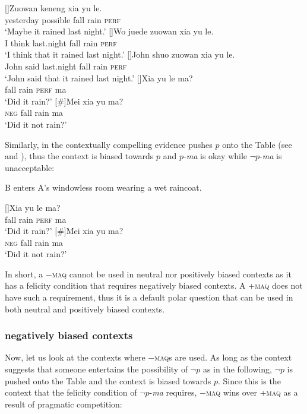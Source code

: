 \documentclass[output=paper,colorlinks,citecolor=brown]{langscibook}
\begin{document}
\ea\label{weakb}
\begin{xlist}
[]{\gll Zuowan keneng  xia yu le. \\
yesterday possible fall rain \textsc{perf}\\
\glt `Maybe it  rained last night.'\label{keneng}}
[]{\gll Wo  juede zuowan xia yu le.\\
I think last.night fall rain \textsc{perf}\\
\glt `I  think that it rained last night.'}
[]{\gll John shuo zuowan  xia yu le. \\
John said last.night  fall rain \textsc{perf}\\
\glt `John said that it rained last night.'\label{john}}
[]{\gll Xia yu le ma?\\
fall rain \textsc{perf} ma \\
\glt `Did it rain?'}
[\#]{\gll Mei xia yu  ma? \\
\textsc{neg} fall rain ma\\
\glt `Did it not rain?' }
\end{xlist}
\z

Similarly, in  the contextually compelling evidence pushes $p$ onto the Table (see  and ), thus the context is biased towards $p$ and  $p$-\emph{ma} is okay while $\neg p$-\emph{ma} is unacceptable:

\ea\label{rc} B enters A's windowless  room wearing a wet raincoat.
\begin{xlist}
[]{\gll Xia yu le ma?\\
fall rain \textsc{perf} ma \\
\glt `Did it rain?'}
[\#]{\gll Mei xia yu  ma? \\
\textsc{neg} fall rain ma\\
\glt `Did it not rain?' }
\end{xlist}
\z

In short, a $-$\textsc{maq}  cannot be used in neutral nor positively biased contexts as it has a felicity condition that requires negatively biased contexts. A +\textsc{maq} does not have such a requirement, thus it is a default polar question that can be used in both neutral and positively biased contexts. 


\subsubsection{negatively biased contexts}\label{subsubsec:neg}
Now, let us look at the contexts where $-$\textsc{maq}s are used.   As long as the context suggests that someone entertains the possibility of $\neg p$ as in the following, $\neg p$ is pushed onto the Table and  the context is biased towards $p$.  Since this is the context that the felicity condition of $\neg p$-\emph{ma}  requires, $-$\textsc{maq} wins over +\textsc{maq} as a result of pragmatic competition:
\end{document}
